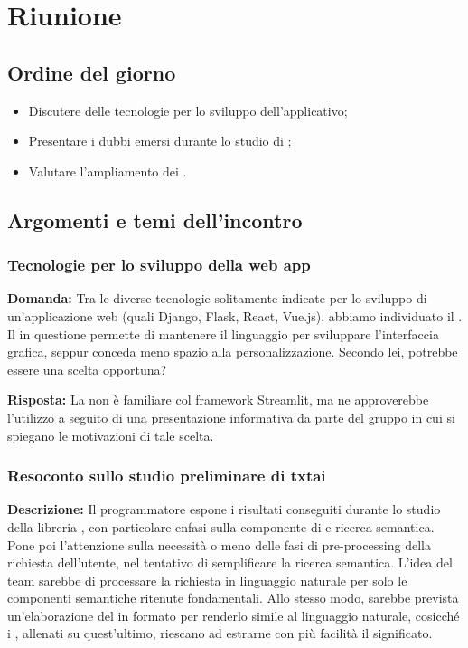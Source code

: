 \section{Riunione}
\subsection{Ordine del giorno}
\begin{itemize}
\item Discutere delle tecnologie per lo sviluppo dell'applicativo;
\item Presentare i dubbi emersi durante lo studio di ;
\item Valutare l'ampliamento dei .
\end{itemize}

\subsection{Argomenti e temi dell'incontro}

\subsubsection{Tecnologie per lo sviluppo della web app}

\textbf{Domanda:} Tra le diverse tecnologie solitamente indicate per lo sviluppo di un'applicazione web (quali Django, Flask, React, Vue.js), abbiamo individuato il  . 
Il  in questione permette di mantenere il linguaggio  per sviluppare l'interfaccia grafica, seppur conceda meno spazio alla personalizzazione. 
Secondo lei, potrebbe essere una scelta opportuna?

\textbf{Risposta:} La  non è familiare col framework Streamlit, ma ne approverebbe l'utilizzo a seguito di una presentazione informativa da parte del gruppo in cui si spiegano le motivazioni di tale scelta.

\subsubsection{Resoconto sullo studio preliminare di txtai}

\textbf{Descrizione:} Il programmatore espone i risultati conseguiti durante lo studio della libreria , con particolare enfasi sulla componente di  e ricerca semantica. 
Pone poi l'attenzione sulla necessità o meno delle fasi di pre-processing della richiesta dell'utente, nel tentativo di semplificare la ricerca semantica. 
L'idea del team sarebbe di processare la richiesta in linguaggio naturale per  solo le componenti semantiche ritenute fondamentali. Allo stesso modo, sarebbe prevista un'elaborazione del  in formato  per renderlo simile al linguaggio naturale, cosicché i , allenati su quest'ultimo, riescano ad estrarne con più facilità il significato.

